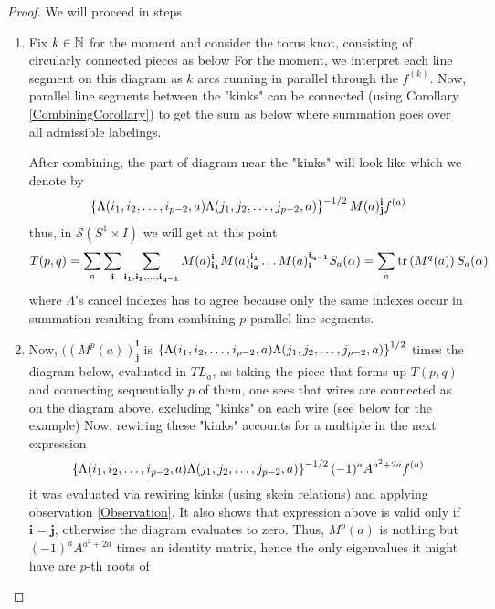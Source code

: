 \documentclass[10pt]{article} %
\theoremstyle{remark}
\renewcommand{\S}{\mathcal{S}}
\newcommand{\f}[1]{f^{(#1)}}
\begin{document}
\begin{proof}We will proceed in steps\\\begin{enumerate}[1$^\circ$]
	\item Fix $k\in\mathbb{N}$ for the moment and consider the torus knot, consisting of circularly connected pieces as below
	For the moment, we interpret each line segment
	on this diagram as $k$ arcs running in parallel through the $\f{k}$. Now, parallel line segments
	between the "kinks" can be connected (using Corollary \ref{CombiningCorollary}) to get the sum as below
	where summation goes over all admissible labelings.

	After combining, the part of diagram near the "kinks" will look like
	which we denote by
	\[\mycbra{\Lambda(i_1,i_2,\hdots,i_{p-2},a)\Lambda(j_1,j_2,\hdots,j_{p-2},a)}^{-1/2}M(a)^{\mathbf{i}}_{\mathbf{j}}\f{a}\]
	thus, in $\S(S^1\times I)$ we will get at this point
	\[T(p,q)=\sum_a\sum_\mathbf{i}\sum_{\mathbf{i_1},\mathbf{i_2},\hdots,\mathbf{i_{q-1}}}M(a)^\mathbf{i}_\mathbf{i_1}
	M(a)^\mathbf{i_1}_\mathbf{i_2}\hdots M(a)^\mathbf{i_{q-1}}_\mathbf{i}S_a(\alpha)=\sum_a\mbox{tr}\mybra{M^q(a)}S_a(\alpha)\]
	where $\Lambda$'s cancel
	indexes has to agree because only the same indexes occur in summation resulting from combining $p$ parallel line segments.
\item Now, $((M^p(a))^\mathbf{i}_\mathbf{j}$ is $\left\{\Lambda(i_1,i_2,\hdots,i_{p-2},a)\Lambda(j_1,j_2,\hdots,j_{p-2},a)\right\}^{1/2}$ times the diagram
	below, evaluated in $TL_a$,
	as taking the piece that forms up $T(p,q)$ and connecting sequentially $p$ of them, one sees that
	wires are connected as on the diagram above, excluding "kinks" on each wire (see below for the example)
	Now, rewiring these "kinks" accounts for a multiple in the next expression
	\[\mycbra{\Lambda(i_1,i_2,\hdots,i_{p-2},a)\Lambda(j_1,j_2,\hdots,j_{p-2},a)}^{-1/2}(-1)^aA^{a^2+2a}\f{a}\]
	it was evaluated via rewiring kinks (using skein relations) and applying observation \ref{Observation}. It also shows that 
	expression above is valid only if $\mathbf{i}=\mathbf{j}$, otherwise the diagram evaluates to zero. Thus,
	$M^p(a)$ is nothing but $(-1)^aA^{a^2+2a}$ times an identity matrix, hence the only eigenvalues it might have are $p$-th roots of

\end{enumerate}
\end{proof}
\end{document}
